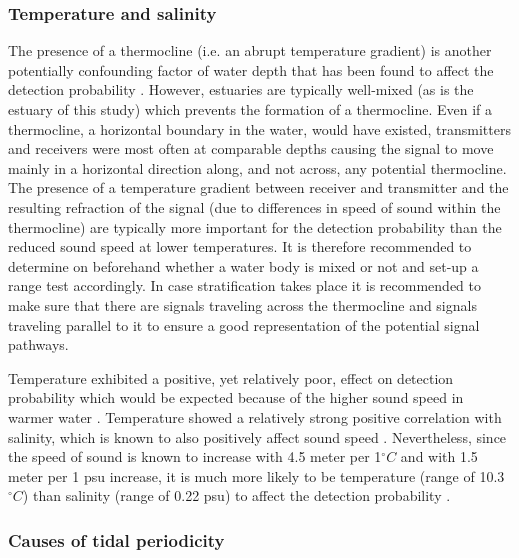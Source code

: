 \documentclass[doublespacing,linenumbers]{bmcart}
\begin{document}
\subsubsection*{Temperature and salinity}

The presence of a thermocline (i.e. an abrupt temperature gradient) is another potentially confounding factor of water depth that has been found to affect the detection probability \cite{Kuai2021StrongLake}. However, estuaries are typically well-mixed (as is the estuary of this study) which prevents the formation of a thermocline. Even if a thermocline, a horizontal boundary in the water, would have existed, transmitters and receivers were most often at comparable depths causing the signal to move mainly in a horizontal direction along, and not across, any potential thermocline. The presence of a temperature gradient between receiver and transmitter and the resulting refraction of the signal (due to differences in speed of sound within the thermocline) are typically more important for the detection probability than the reduced sound speed at lower temperatures. It is therefore recommended to determine on beforehand whether a water body is mixed or not and set-up a range test accordingly. In case stratification takes place it is recommended to make sure that there are signals traveling across the thermocline and signals traveling parallel to it to ensure a good representation of the potential signal pathways. 

Temperature exhibited a positive, yet relatively poor, effect on detection probability which would be expected because of the higher sound speed in warmer water \cite{Medwin1998FundamentalsOceanography}. Temperature showed a relatively strong positive correlation with salinity, which is known to also positively affect sound speed \cite{Medwin1998FundamentalsOceanography}. Nevertheless, since the speed of sound is known to increase with 4.5 meter per 1$^\circ C$ and with 1.5 meter per 1 psu increase, it is much more likely to be temperature (range of 10.3$^\circ C$) than salinity (range of 0.22 psu) to affect the detection probability \cite{Belogolskii2002TemperatureSeawater}. 

\subsubsection*{Causes of tidal periodicity}
\end{document}
